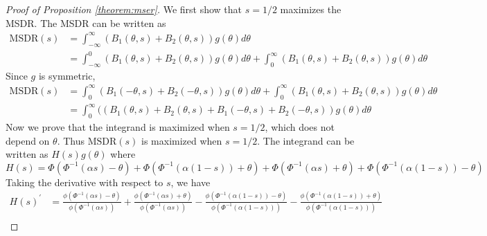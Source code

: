 \documentclass[11pt]{article}
\begin{document}
\begin{proof}[Proof of  Proposition \ref{theorem:mser}]
   We first show that $s=1/2$ maximizes the MSDR. The MSDR can be written as 
	\begin{equation*}
		\begin{split}
			\text{MSDR}(s) &= \int_{-\infty}^{\infty} (B_1(\theta,s) + B_2(\theta,s) ) g(\theta)d \theta \\
			& = \int_{-\infty}^{0} (B_1(\theta,s) + B_2(\theta,s) ) g(\theta)d \theta +\int_{0}^{\infty} (B_1(\theta,s) + B_2(\theta,s) ) g(\theta)d \theta 
		\end{split}
	\end{equation*}
	Since $g$ is symmetric,
	\begin{equation*}
		\begin{split}
			\text{MSDR}(s)
			& = \int_{0}^{\infty} (B_1(-\theta,s) + B_2(-\theta,s) ) g(\theta)d \theta +\int_{0}^{\infty} (B_1(\theta,s) + B_2(\theta,s) ) g(\theta)d \theta \\
			& = \int_{0}^{\infty} ((B_1(\theta,s) + B_2(\theta,s) +B_1(-\theta,s) + B_2(-\theta,s) )g(\theta) d\theta
		\end{split}
	\end{equation*}
	Now we prove that the integrand is maximized when $s=1/2$, which does not depend on $\theta$. Thus $\text{MSDR}(s)$ is maximized when $s=1/2$. The integrand can be written as $H(s)g(\theta)$ where
	\begin{equation}
		H(s) = \Phi(\Phi^{-1}(\alpha s) - \theta)+\Phi(\Phi^{-1}(\alpha (1-s)) + \theta)+ \Phi(\Phi^{-1}(\alpha s) + \theta)+ \Phi(\Phi^{-1}(\alpha (1-s)) - \theta)
		\label{eq:integrand}
	\end{equation}
	Taking the derivative with respect to $s$, we have
	\begin{equation}
		\begin{split}
			H(s)^\prime &= \frac{\phi(\Phi^{-1}(\alpha s)-\theta)}{\phi(\Phi^{-1}(\alpha s))} +\frac{\phi(\Phi^{-1}(\alpha s)+\theta)}{\phi(\Phi^{-1}(\alpha s))} -\frac{\phi(\Phi^{-1}(\alpha (1-s))-\theta)}{\phi(\Phi^{-1}(\alpha (1-s)))} - \frac{\phi(\Phi^{-1}(\alpha (1-s))+\theta)}{\phi(\Phi^{-1}(\alpha (1-s)))} \\

\end{split}
\end{equation}
\end{proof}
\end{document}
